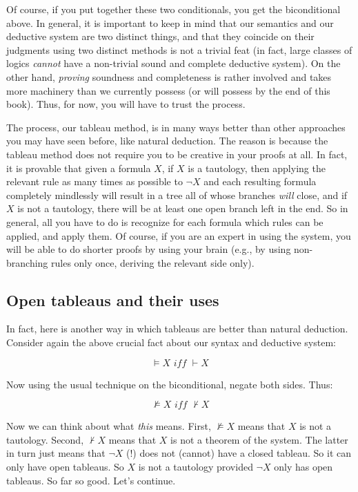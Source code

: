 Of course, if you put together these two conditionals, you get the biconditional above. In general, it is important to keep in mind that our semantics and our deductive system are two distinct things, and that they coincide on their judgments using two distinct methods is not a trivial feat (in fact, large classes of logics \textit{cannot} have a non-trivial sound and complete deductive system). On the other hand, \textit{proving} soundness and completeness is rather involved and takes more machinery than we currently possess (or will possess by the end of this book). Thus, for now, you will have to trust the process. 

The process, our tableau method, is in many ways better than other approaches you may have seen before, like natural deduction. The reason is because the tableau method does not require you to be creative in your proofs at all. In fact, it is provable that given a formula $X$, if $X$ is a tautology, then applying the relevant rule as many times as possible to $ \neg X$ and each resulting formula completely mindlessly will result in a tree all of whose branches \textit{will} close, and if $X$ is not a tautology, there will be at least one open branch left in the end. So in general, all you have to do is recognize for each formula which rules can be applied, and apply them. Of course, if you are an expert in using the system, you will be able to do shorter proofs by using your brain (e.g., by using non-branching rules only once, deriving the relevant side only). 

\subsection{Open tableaus and their uses}

In fact, here is another way in which tableaus are better than natural deduction. Consider again the above crucial fact about our syntax and deductive system:

\[\models X \textit{ iff } \vdash X\]

Now using the usual technique on the biconditional, negate both sides. Thus: 

\[\not\models X \textit{ iff } \nvdash X\]

Now we can think about what \textit{this} means. First, $\not\models X$ means that $X$ is not a tautology. Second, $\nvdash X$ means that $X$ is not a theorem of the system. The latter in turn just means that $\neg X$ (!)  does not (cannot) have a closed tableau. So it can only have open tableaus. So $X$ is not a tautology provided $\neg X$ only has open tableaus. So far so good. Let's continue. 

